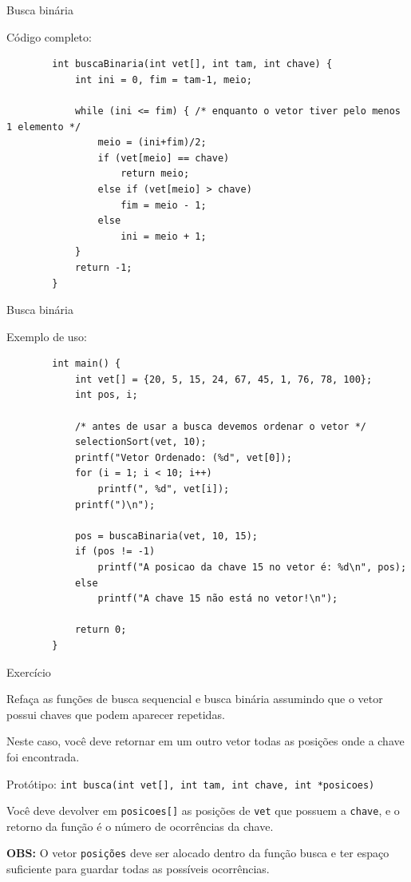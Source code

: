 \documentclass[handout]{beamer}
\newcommand{\cod}[1]{\texttt{#1}}
\begin{document}
\begin{frame}[fragile]{Busca binária}

    Código completo:
    \vspace{-1em}
    \begin{verbatim}
        int buscaBinaria(int vet[], int tam, int chave) {
            int ini = 0, fim = tam-1, meio;

            while (ini <= fim) { /* enquanto o vetor tiver pelo menos 1 elemento */
                meio = (ini+fim)/2;
                if (vet[meio] == chave)
                    return meio;
                else if (vet[meio] > chave)
                    fim = meio - 1;
                else
                    ini = meio + 1;
            }
            return -1;
        }
    \end{verbatim}

\end{frame}

\begin{frame}[fragile]{Busca binária}

    Exemplo de uso:
    \vspace{-1em}
    \begin{verbatim}
        int main() {
            int vet[] = {20, 5, 15, 24, 67, 45, 1, 76, 78, 100};
            int pos, i;

            /* antes de usar a busca devemos ordenar o vetor */
            selectionSort(vet, 10);
            printf("Vetor Ordenado: (%d", vet[0]);
            for (i = 1; i < 10; i++)
                printf(", %d", vet[i]);
            printf(")\n");

            pos = buscaBinaria(vet, 10, 15);
            if (pos != -1)
                printf("A posicao da chave 15 no vetor é: %d\n", pos);
            else
                printf("A chave 15 não está no vetor!\n");

            return 0;
        }
    \end{verbatim} 

\end{frame}

\begin{frame}[fragile]{Exercício}

    Refaça as funções de busca sequencial e busca binária assumindo que o vetor possui chaves que podem aparecer repetidas.
    
    Neste caso, você deve retornar em um outro vetor todas as posições onde a chave foi encontrada.

    Protótipo: \cod{int busca(int vet[], int tam, int chave, int *posicoes)}

    Você deve devolver em \cod{posicoes[]} as posições de \cod{vet} que possuem a \cod{chave}, e o retorno da função é o número de ocorrências da chave.

    \textbf{OBS:} O vetor \cod{posições} deve ser alocado dentro da função busca e ter espaço suficiente para guardar todas as possíveis ocorrências.

\end{frame}
\end{document}

